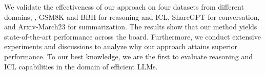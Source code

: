 We validate the effectiveness of our approach on four datasets from different domains, \ie, GSM8K and BBH for reasoning and ICL, ShareGPT for conversation, and Arxiv-March23 for summarization.
The results show that our method yields state-of-the-art performance across the board.
Furthermore, we conduct extensive experiments and discussions to analyze why our approach attains superior performance.
To our best knowledge, we are the first to evaluate reasoning and ICL capabilities in the domain of efficient LLMs.

